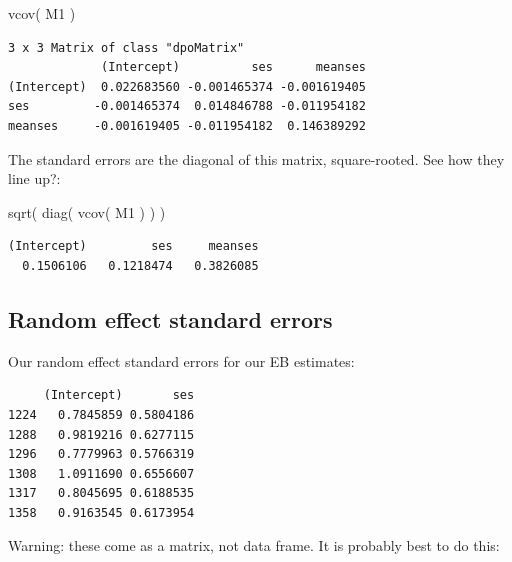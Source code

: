 \documentclass[
  letterpaper,
  DIV=11,
  numbers=noendperiod]{scrreprt}
\newenvironment{Shaded}{\begin{snugshade}}{\end{snugshade}}
\newcommand{\FunctionTok}[1]{\textcolor[rgb]{0.02,0.16,0.49}{#1}}
\newcommand{\NormalTok}[1]{\textcolor[rgb]{0.00,0.44,0.13}{#1}}
\newcommand{\SpecialCharTok}[1]{\textcolor[rgb]{0.25,0.44,0.63}{#1}}
\begin{document}
\begin{Shaded}
\begin{Highlighting}[]
\FunctionTok{vcov}\NormalTok{( M1 )}
\end{Highlighting}
\end{Shaded}

\begin{verbatim}
3 x 3 Matrix of class "dpoMatrix"
             (Intercept)          ses      meanses
(Intercept)  0.022683560 -0.001465374 -0.001619405
ses         -0.001465374  0.014846788 -0.011954182
meanses     -0.001619405 -0.011954182  0.146389292
\end{verbatim}

The standard errors are the diagonal of this matrix, square-rooted. See
how they line up?:

\begin{Shaded}
\begin{Highlighting}[]
\FunctionTok{sqrt}\NormalTok{( }\FunctionTok{diag}\NormalTok{( }\FunctionTok{vcov}\NormalTok{( M1 ) ) )}
\end{Highlighting}
\end{Shaded}

\begin{verbatim}
(Intercept)         ses     meanses 
  0.1506106   0.1218474   0.3826085 
\end{verbatim}

\hypertarget{random-effect-standard-errors}{%
\subsection{Random effect standard
errors}\label{random-effect-standard-errors}}

Our random effect standard errors for our EB estimates:

\begin{Shaded}
\end{Shaded}

\begin{verbatim}
     (Intercept)       ses
1224   0.7845859 0.5804186
1288   0.9819216 0.6277115
1296   0.7779963 0.5766319
1308   1.0911690 0.6556607
1317   0.8045695 0.6188535
1358   0.9163545 0.6173954
\end{verbatim}

Warning: these come as a matrix, not data frame. It is probably best to
do this:
\end{document}
